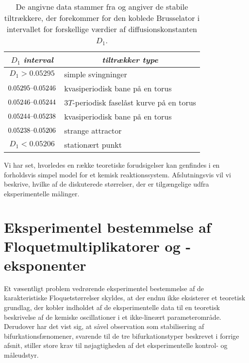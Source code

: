 \capsize
\begin{table}[htbp] 
 \renewcommand{\capfont}{\bf}
 \begin{center} 
  \begin{tabular}{|c|l|}                        \hline\hline
   $D_1$ {\em interval} & \multicolumn{1}{c|}{\em tiltr{\ae}kker type} \\ \hline
   $D_1 > 0.05295     $ & simple svingninger   \\ \hline
   $0.05295 \mbox{--} 0.05246$ & kvasiperiodisk bane p{\aa} en torus \\ \hline
   $0.05246 \mbox{--} 0.05244$ & $3T$-periodisk fasel{\aa}st kurve 
			      p{\aa} en torus\\ \hline
   $0.05244 \mbox{--} 0.05238$ & kvasiperiodisk bane p{\aa} en torus \\ \hline
   $0.05238 \mbox{--} 0.05206$ & strange attractor               \\ \hline
   $D_1 < 0.05206$          & station{\ae}rt punkt           \\\hline\hline
  \end{tabular}
 \end{center} 
 \caption{\protect\capsize
  De angivne data stammer fra \protect\cite{Marek2} og
  angiver de stabile tiltr{\ae}kkere, der forekommer for
  den koblede Brusselator i intervallet for forskellige
  v{\ae}rdier af diffusionskonstanten $D_1$.}
 \label{tab:TorusData}
\renewcommand{\capfont}{\rm}
\end{table} 
\normalsize

\vspace{4.0mm}
Vi har set, hvorledes en r{\ae}kke teoretiske forudsigelser
kan genfindes i en for\-holds\-vis simpel model for et
kemisk reaktionssy\-stem. Afslutningsvis vil vi beskrive,
hvilke af de diskuterede st{\o}rrelser, der er
tilg{\ae}ngelige udfra eksperimentelle m{\aa}linger.

\section{Eksperimentel bestemmelse af
Floquet\-multiplikatorer og -eks\-ponenter}

Et v{\ae}sentligt
problem vedr{\o}rende eksperimentel bestemmelse af de
karakteristiske Floquetst{\o}rrelser skyldes, at der endnu
ikke eksisterer et teoretisk grundlag, der kobler indholdet
af de eksperimentelle data til en teoretisk beskrivelse af
de kemiske oscillationer i et ikke-line{\ae}rt
parameteromr{\aa}de. Derudover har det vist sig, at
s{\aa}vel observation som stabilisering af
bifurkationsf{\ae}nomener, svarende til de tre
bifurkationstyper beskrevet i forrige af\-snit, stiller
store krav til n{\o}jagtigheden af det eksperimentelle
kontrol- og m{\aa}leudstyr.

